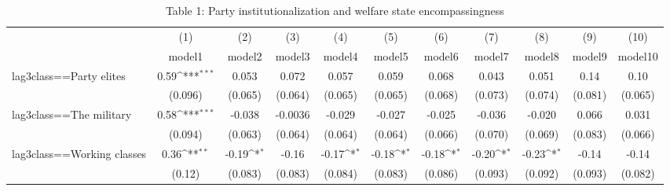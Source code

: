 \begin{table}[htbp]\centering
\def\sym#1{\ifmmode^{#1}\else\(^{#1}\)\fi}
\caption{Table 1: Party institutionalization and welfare state encompassingness}
\begin{tabular}{l*{10}{c}}
\hline\hline
                    &\multicolumn{1}{c}{(1)}         &\multicolumn{1}{c}{(2)}         &\multicolumn{1}{c}{(3)}         &\multicolumn{1}{c}{(4)}         &\multicolumn{1}{c}{(5)}         &\multicolumn{1}{c}{(6)}         &\multicolumn{1}{c}{(7)}         &\multicolumn{1}{c}{(8)}         &\multicolumn{1}{c}{(9)}         &\multicolumn{1}{c}{(10)}         \\
                    &      model1         &      model2         &      model3         &      model4         &      model5         &      model6         &      model7         &      model8         &      model9         &     model10         \\
\hline
lag3class==Party elites&        0.59\sym{***}&       0.053         &       0.072         &       0.057         &       0.059         &       0.068         &       0.043         &       0.051         &        0.14         &        0.10         \\
                    &     (0.096)         &     (0.065)         &     (0.064)         &     (0.065)         &     (0.065)         &     (0.068)         &     (0.073)         &     (0.074)         &     (0.081)         &     (0.065)         \\
[1em]
lag3class==The military&        0.58\sym{***}&      -0.038         &     -0.0036         &      -0.029         &      -0.027         &      -0.025         &      -0.036         &      -0.020         &       0.066         &       0.031         \\
                    &     (0.094)         &     (0.063)         &     (0.064)         &     (0.064)         &     (0.064)         &     (0.066)         &     (0.070)         &     (0.069)         &     (0.083)         &     (0.066)         \\
[1em]
lag3class==Working classes&        0.36\sym{**} &       -0.19\sym{*}  &       -0.16         &       -0.17\sym{*}  &       -0.18\sym{*}  &       -0.18\sym{*}  &       -0.20\sym{*}  &       -0.23\sym{*}  &       -0.14         &       -0.14         \\
                    &      (0.12)         &     (0.083)         &     (0.083)         &     (0.084)         &     (0.083)         &     (0.086)         &     (0.093)         &     (0.092)         &     (0.093)         &     (0.082)         \\

\end{tabular}
\end{table}
